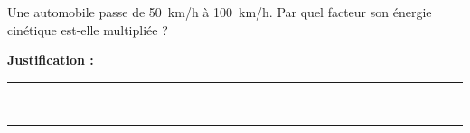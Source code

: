 Une automobile passe de \qty{50}{km/h} à \qty{100}{km/h}. Par quel facteur son énergie cinétique est-elle multipliée ?

\choices

\noindent\textbf{Justification :} \hrulefill \\[2.5ex]
\rule{\linewidth}{0.4pt} \\[2.5ex]
\rule{\linewidth}{0.4pt}
\vfill
